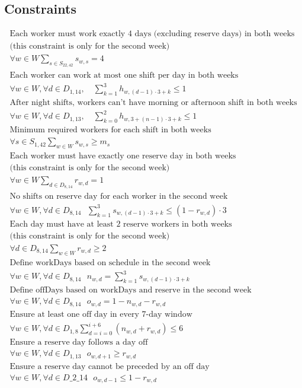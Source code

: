 \documentclass{article}
\begin{document}
\subsection*{Constraints}
\begin{gather*}
\text{Each worker must work exactly 4 days (excluding reserve days) in both weeks} \\
\text{(this constraint is only for the second week)} \\
\forall w \in W \sum_{s \in S_{22, 42}} s_{w, s} = 4 \\
\text{Each worker can work at most one shift per day in both weeks} \\
\forall w \in W, \forall d \in D_{1, 14}, \quad \sum_{k=1}^{3} h_{w, (d - 1) \cdot 3 + k} \leq 1 \\
\text{After night shifts, workers can't have morning or afternoon shift in both weeks} \\
\forall w \in W, \forall d \in D_{1, 13}, \quad \sum_{k=0}^{2} h_{w, 3 + (n - 1) \cdot 3 + k} \leq 1 \\
\text{Minimum required workers for each shift in both weeks} \\
\forall s \in S_{1, 42} \sum_{w \in W} s_{w, s} \geq m_{s} \\
\text{Each worker must have exactly one reserve day in both weeks} \\
\text{(this constraint is only for the second week)} \\
\forall w \in W \sum_{d \in D_{8, 14}} r_{w, d} = 1 \\
\text{No shifts on reserve day for each worker in the second week} \\
\forall w \in W, \forall d \in D_{8, 14} \text{ } \sum_{k=1}^{3} s_{w, (d-1) \cdot 3 + k} \leq (1 - r_{w, d}) \cdot 3 \\
\text{Each day must have at least 2 reserve workers in both weeks} \\
\text{(this constraint is only for the second week)} \\
\forall d \in D_{8, 14} \sum_{w \in W} r_{w, d} \geq 2 \\
\text{Define workDays based on schedule in the second week} \\
\forall w \in W, \forall d \in D_{8, 14} \text{ } n_{w, d} = \sum_{k=1}^{3} s_{w, (d-1) \cdot 3 + k} \\
\text{Define offDays based on workDays and reserve in the second week} \\
\forall w \in W, \forall d \in D_{8, 14} \text{ } o_{w, d} = 1 - n_{w, d} - r_{w, d} \\
\text{Ensure at least one off day in every 7-day window} \\
\forall w \in W, \forall d \in D_{1, 8} \sum_{d = i = 0}^{i+6} (n_{w, d} + r_{w, d}) \leq 6 \\
\text{Ensure a reserve day follows a day off} \\
\forall w \in W, \forall d \in D_{1, 13} \text{ } o_{w, d + 1} \geq r_{w, d} \\
\text{Ensure a reserve day cannot be preceded by an off day} \\
\forall w \in W, \forall d \in D\_2\_14 \text{ } o_{w, d - 1} \leq 1 - r_{w, d} 
\end{gather*}
\end{document}
